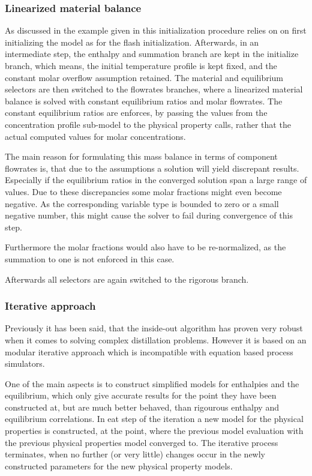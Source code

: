     \subsubsection{Linearized material balance}
        As discussed in the example given in  this initialization 
        procedure relies on on first initializing the model as for the flash initialization. Afterwards, 
        in an intermediate step, the enthalpy and summation branch are kept in the initialize branch, 
        which means, the initial temperature profile is kept fixed, and the constant molar overflow assumption 
        retained. The material and equilibrium selectors are then switched to the flowrates branches, where 
        a linearized material balance is solved with constant equilibrium ratios and molar flowrates. 
        The constant equilibrium ratios are enforces, by passing the values from the concentration profile
        sub-model to the physical property calls, rather that the actual computed values for molar
        concentrations. 
        
        The main reason for formulating this mass balance in terms of component flowrates is, that due to 
        the assumptions a solution will yield discrepant results. Especially if the equilibrium ratios 
        in the converged solution span a large range of values. Due to these discrepancies some 
        molar fractions might even become negative. As the corresponding variable type is bounded to zero 
        or a small negative number, this might cause the solver to fail during convergence of this step. 
        
        Furthermore the molar fractions would also have to be re-normalized, as the summation to one 
        is not enforced in this case. 
        
        Afterwards all selectors are again switched to the rigorous branch.  
        
    \subsubsection{Iterative approach}
        Previously it has been said, that the inside-out algorithm has proven very robust when 
        it comes to solving complex distillation problems. However it is based on an modular 
        iterative approach which is incompatible with equation based process simulators. 
        
        One of the main aspects is to construct simplified models for enthalpies and the equilibrium, 
        which only give accurate results for the point they have been constructed at, but are much 
        better behaved, than rigourous enthalpy and equilibrium correlations. In eat step of the iteration 
        a new model for the physical properties is constructed, at the point, where the previous model 
        evaluation with the previous physical properties model converged to. The iterative process terminates, 
        when no further (or very little) changes occur in the newly constructed parameters for the 
        new physical property models.  
        
